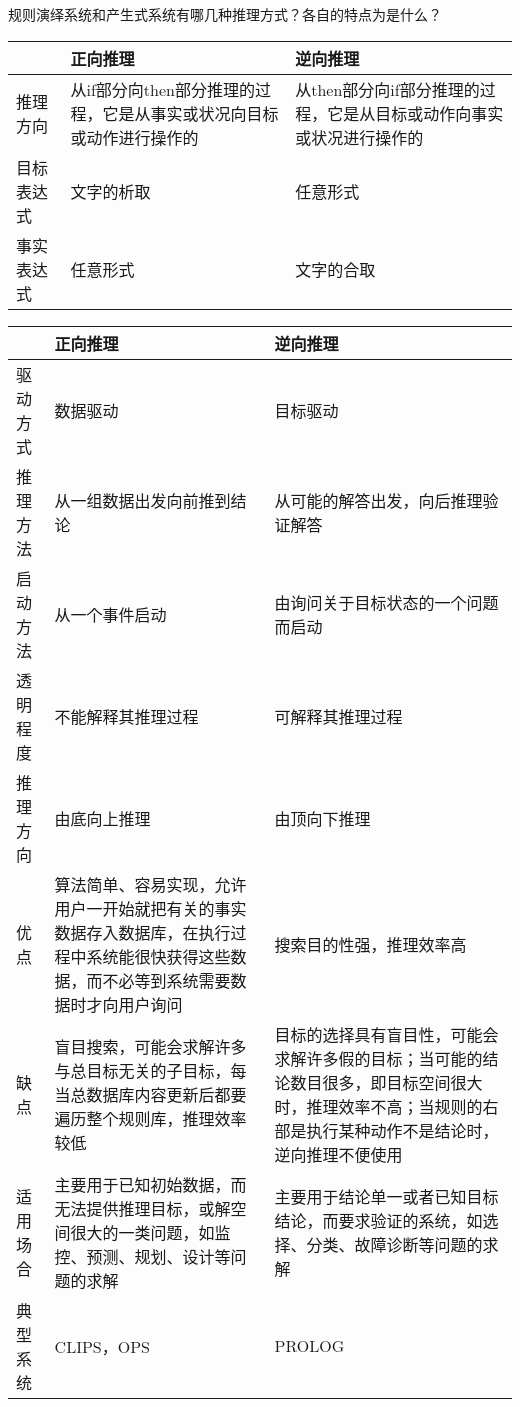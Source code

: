 \begin{question}
规则演绎系统和产生式系统有哪几种推理方式？各自的特点为是什么？
\end{question}
\begin{solution}

	\begin{table}[htbp]
	\centering
	\begin{tabular}{p{80pt}p{90pt}p{90pt}}
		\toprule
		~ & 正向推理 & 逆向推理 \\
		\midrule
		推理方向 & 从if部分向then部分推理的过程，它是从事实或状况向目标或动作进行操作的 & 从then部分向if部分推理的过程，它是从目标或动作向事实或状况进行操作的 \\
		\midrule
		目标表达式 & 文字的析取 & 任意形式 \\
		\midrule
		事实表达式 & 任意形式 & 文字的合取 \\
		\bottomrule
	\end{tabular}
	\end{table} 
	
	\begin{table}[htbp]
	\centering
	\begin{tabular}{p{80pt}p{80pt}p{80pt}}
		\toprule
		~ & 正向推理 & 逆向推理 \\
		\midrule
		驱动方式 & 数据驱动 & 目标驱动 \\
		推理方法 & 从一组数据出发向前推到结论 & 从可能的解答出发，向后推理验证解答 \\
		启动方法 & 从一个事件启动 & 由询问关于目标状态的一个问题而启动 \\
		透明程度 & 不能解释其推理过程 & 可解释其推理过程 \\
		推理方向 & 由底向上推理 & 由顶向下推理 \\
		优点 & 算法简单、容易实现，允许用户一开始就把有关的事实数据存入数据库，在执行过程中系统能很快获得这些数据，而不必等到系统需要数据时才向用户询问 & 搜索目的性强，推理效率高 \\
		缺点 & 盲目搜索，可能会求解许多与总目标无关的子目标，每当总数据库内容更新后都要遍历整个规则库，推理效率较低 & 目标的选择具有盲目性，可能会求解许多假的目标；当可能的结论数目很多，即目标空间很大时，推理效率不高；当规则的右部是执行某种动作不是结论时，逆向推理不便使用 \\
		适用场合 & 主要用于已知初始数据，而无法提供推理目标，或解空间很大的一类问题，如监控、预测、规划、设计等问题的求解 & 主要用于结论单一或者已知目标结论，而要求验证的系统，如选择、分类、故障诊断等问题的求解 \\
		典型系统 & CLIPS，OPS & PROLOG \\
		\bottomrule
	\end{tabular}
	\end{table}
\end{solution}

